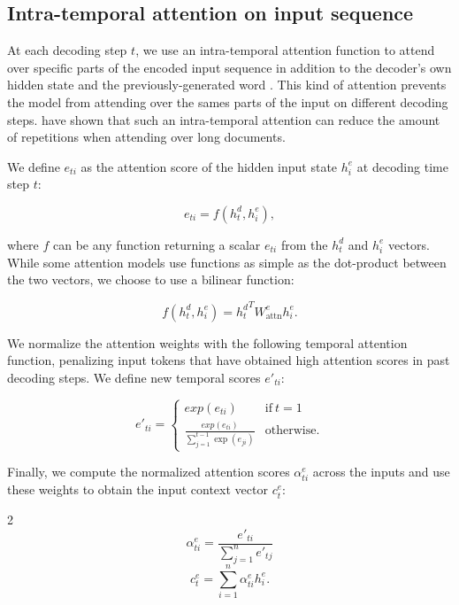 \subsection{Intra-temporal attention on input sequence}
\label{ssec:tmp-attention}

At each decoding step $t$, we use an intra-temporal attention function to attend over specific parts of the encoded input sequence in addition to the decoder's own hidden state and the previously-generated word \citep{sankaran2016}. This kind of attention prevents the model from attending over the sames parts of the input on different decoding steps. \citet{nallapati2016} have shown that such an intra-temporal attention can reduce the amount of repetitions when attending over long documents.

We define $e_{ti}$ as the attention score of the hidden input state $h^e_i$ at decoding time step $t$:

\begin{equation}
e_{ti} = f(h^d_t, h^e_i),
\label{eq:attention-weights-unnorm}
\end{equation}

where $f$ can be any function returning a scalar $e_{ti}$ from the $h^d_t$ and $h^e_i$ vectors. While some attention models use functions as simple as the dot-product between the two vectors, we choose to use a bilinear function:

\begin{equation}
f(h^d_t, h^e_i) = {h^d_t}^T W^e_\textrm{attn} h^e_i.
\label{eq:attention-function}
\end{equation}

We normalize the attention weights with the following temporal attention function, penalizing input tokens that have obtained high attention scores in past decoding steps. We define new temporal scores $e'_{ti}$:

\begin{equation}
e'_{ti} = \begin{cases}
    exp(e_{ti}) & \text{if}\ t = 1 \\
    \frac{exp(e_{ti})}{\sum_{j=1}^{t-1} \exp(e_{ji})} & \text{otherwise}.
    \end{cases}
\label{eq:temporal-attention-2}
\end{equation}

Finally, we compute the normalized attention scores $\alpha^e_{ti}$ across the inputs and use these weights to obtain the input context vector $c^e_t$:

\begin{multicols}{2}
\begin{equation}
\alpha^e_{ti} = \frac{e'_{ti}}{\sum_{j=1}^{n} e'_{tj}}
\label{eq:temporal-attention-weights-softmax}
\end{equation}
\begin{equation}
c^e_t = \sum_{i=1}^{n} \alpha^e_{ti} h^e_i.
\label{eq:attention-context}
\end{equation}
\end{multicols}

